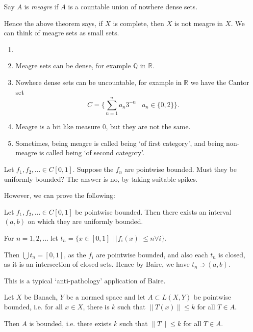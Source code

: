 \documentclass[12pt]{article}
\begin{document}
Say $A$ is \emph{meagre} if $A$ is a countable union of nowhere dense sets.

Hence the above theorem says, if $X$ is complete, then $X$ is not meagre in $X$. We can think of meagre sets as small sets.

\begin{remark}
	\begin{enumerate}
		\item[]
		\item Meagre sets can be dense, for example $\mathbb{Q}$ in $\mathbb{R}$.
		\item Nowhere dense sets can be uncountable, for example in $\mathbb{R}$ we have the Cantor set
			\[
				C = \biggl\{ \sum_{n = 1}^{n} a_n 3^{-n} \mid a_n \in \{0, 2\}\biggr\}.
			\]
		\item Meagre is a bit like measure $0$, but they are not the same.
		\item Sometimes, being meagre is called being `of first category', and being non-meagre is called being `of second category'.
	\end{enumerate}
	
\end{remark}


Let $f_1, f_2, \ldots \in C[0, 1]$. Suppose the $f_n$ are pointwise bounded. Must they be uniformly bounded? The answer is no, by taking suitable spikes.

However, we can prove the following:

\begin{theorem}
	Let $f_1, f_2, \ldots \in C[0,1]$ be pointwise bounded. Then there exists an interval $(a, b)$ on which they are uniformly bounded.
\end{theorem}


\begin{proofbox}
	For $n = 1, 2, \ldots$ let $t_n = \{x \in [0, 1] \mid |f_i(x)| \leq n \forall i\}$.

	Then $\bigcup t_n = [0,1]$, as the $f_i$ are pointwise bounded, and also each $t_n$ is closed, as it is an intersection of closed sets. Hence by Baire, we have $t_n \supset (a, b)$.
\end{proofbox}

This is a typical `anti-pathology' application of Baire.

\begin{theorem}
	Let $X$ be Banach, $Y$ be a normed space and let $A \subset L(X,Y)$ be pointwise bounded, i.e. for all $x \in X$, there is $k$ such that $\|T(x)\| \leq k$ for all $T \in A$.

	Then $A$ is bounded, i.e. there exists $k$ such that $\|T\| \leq k$ for all $T \in A$.
\end{theorem}
\end{document}
